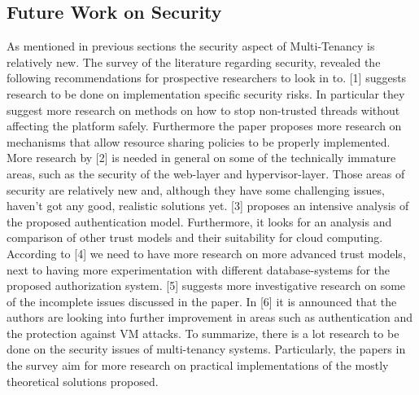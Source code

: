 \subsection{Future Work on Security}
As mentioned in previous sections the security aspect of Multi-Tenancy is relatively new. The survey of the literature regarding security, revealed the following recommendations for prospective researchers to look in to. [1] suggests research to be done on implementation specific security risks. In particular they suggest more research on methods on how to stop non-trusted threads without affecting the platform safely. Furthermore the paper proposes more research on mechanisms that allow resource sharing policies to be properly implemented. More research by [2] is needed in general on some of the technically immature areas, such as the security of the web-layer and hypervisor-layer. Those areas of security are relatively new and, although they have some challenging issues, haven't got any good, realistic solutions yet. [3] proposes an intensive analysis of the proposed authentication model. Furthermore, it looks for an analysis and comparison of other trust models and their suitability for cloud computing. According to [4] we need to have more research on more advanced trust models, next to having more experimentation with different database-systems for the proposed authorization system. [5] suggests more investigative research on some of the incomplete issues discussed in the paper. In [6] it is announced that the authors are looking into further improvement in areas such as authentication and the protection against VM attacks. To summarize, there is a lot research to be done on the security issues of multi-tenancy systems. Particularly, the papers in the survey aim for more research on practical implementations of the mostly theoretical solutions proposed.\\

